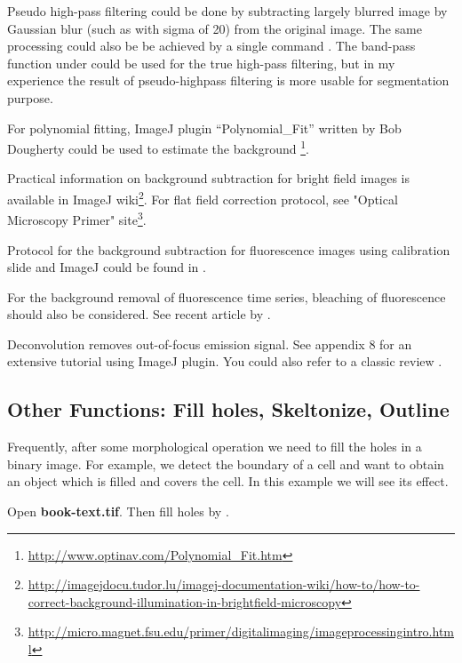 Pseudo high-pass filtering could be done by subtracting 
largely blurred image by Gaussian blur (such as with sigma of 20)  
from the original image. The same processing could also be be achieved by a single command \ijmenu{Process > Filter > Unsharp Mask\ldots]}.  The band-pass function under  could be used for the true high-pass filtering, but in my experience the result of pseudo-highpass filtering is more usable for segmentation purpose. 

For polynomial fitting, ImageJ plugin ``Polynomial\_Fit'' written by Bob
Dougherty could be used to estimate the background
\footnote{\url{http://www.optinav.com/Polynomial_Fit.htm}}.

Practical information on background subtraction for bright field images is
available in ImageJ wiki\footnote{\url{http://imagejdocu.tudor.lu/imagej-documentation-wiki/how-to/how-to-correct-background-illumination-in-brightfield-microscopy}}. 
For flat field correction protocol, see "Optical Microscopy Primer"
site\footnote{\url{http://micro.magnet.fsu.edu/primer/digitalimaging/imageprocessingintro.html}}.

Protocol for the background subtraction for fluorescence
images using calibration slide and ImageJ could be found in
 \cite{MiuraME2005}.

For the background removal of fluorescence time series, bleaching of
fluorescence should also be considered. See recent article by
\cite{Schwarzfischer2011}.

Deconvolution removes out-of-focus emission signal. See appendix 8 for an
extensive tutorial using ImageJ plugin. You could also refer to a classic review
\citep{Wallace2001}.

\subsection{Other Functions: Fill holes, Skeltonize, Outline}

Frequently, after some morphological operation we need to fill the holes
in a binary image. For example, we detect the boundary of a cell and
want to obtain an object which is filled and covers the cell. In this
example we will see its effect.

\begin{indentexercise}{1}
Open \textbf{book-text.tif}. Then fill holes by . 
\end{indentexercise}

\clearpage
